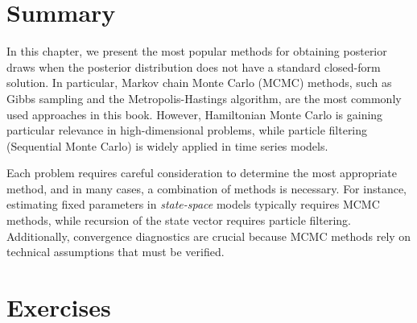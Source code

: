   
\section{Summary}\label{sec55}
In this chapter, we present the most popular methods for obtaining posterior draws when the posterior distribution does not have a standard closed-form solution. In particular, Markov chain Monte Carlo (MCMC) methods, such as Gibbs sampling and the Metropolis-Hastings algorithm, are the most commonly used approaches in this book. However, Hamiltonian Monte Carlo is gaining particular relevance in high-dimensional problems, while particle filtering (Sequential Monte Carlo) is widely applied in time series models.

Each problem requires careful consideration to determine the most appropriate method, and in many cases, a combination of methods is necessary. For instance, estimating fixed parameters in \textit{state-space} models typically requires MCMC methods, while recursion of the state vector requires particle filtering. Additionally, convergence diagnostics are crucial because MCMC methods rely on technical assumptions that must be verified.

\section{Exercises}\label{sec56}

